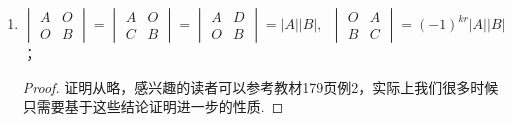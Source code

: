 \begin{enumerate}
    \item $\begin{vmatrix}
                  A & O \\ O & B
              \end{vmatrix} = \begin{vmatrix}
                  A & O \\ C & B
              \end{vmatrix} = \begin{vmatrix}
                  A & D \\ O & B
              \end{vmatrix} = |A||B|,\enspace\begin{vmatrix}
                  O & A \\ B & C
              \end{vmatrix} = (-1)^{kr}|A||B|$；
          \begin{proof}
              证明从略，感兴趣的读者可以参考教材179页例2，实际上我们很多时候只需要基于这些结论证明进一步的性质.
          \end{proof}


\end{enumerate}
